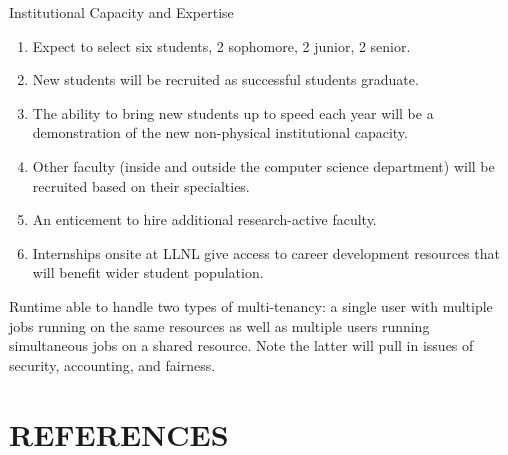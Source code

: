 \documentclass[11pt]{article}
\begin{document}
Institutional Capacity and Expertise
\begin{enumerate}
    \item Expect to select six students, 2 sophomore, 2 junior, 2 senior.
    \item New students will be recruited as successful students graduate.
    \item The ability to bring new students up to speed each year will be a demonstration of the new non-physical institutional capacity.
\item Other faculty (inside and outside the computer science department) will be recruited based on their specialties.
\item An enticement to hire additional research-active faculty.  
\item Internships onsite at LLNL give access to career development resources that will benefit wider student population.
\end{enumerate}



Runtime able to handle two types of multi-tenancy:  a single user with multiple
jobs running on the same resources as well as multiple users running simultaneous
jobs on a shared resource.  Note the latter will pull in issues of security,
accounting, and fairness.



\begingroup
\section{REFERENCES}
\printbibliography[heading=none]
\endgroup
\end{document}
